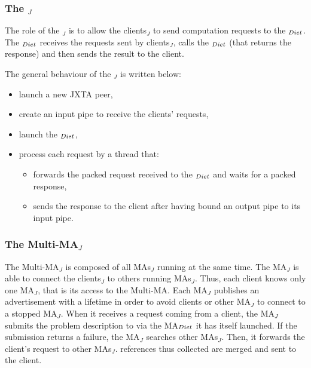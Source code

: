 \subsubsection{The \sed$_{J}$}
\label{sssec:jxtased}

The role of the \sed$_{J}$ is to allow the clients$_{J}$ to send
computation requests to the \sed$_{{\sc Diet}}$. The \sed$_{{\sc Diet}}$ receives
the requests sent by clients$_{J}$, calls the \sed$_{{\sc Diet}}$ (that
returns the response) and then sends the result to the client.

The general behaviour of the \sed$_{J}$ is written below:

\begin{itemize}
  
\item{launch a new JXTA peer,}
\item{create an input pipe to receive the clients' requests,}
\item{launch the \sed$_{{\sc Diet}}$,}
\item{process each request by a thread that:
\begin{itemize}
\item{forwards the packed request received to the \sed$_{{\sc Diet}}$ and
    waits for a packed response,}
\item{sends the response to the client after having bound an output
    pipe to its input pipe.}
\end {itemize}}
\end{itemize}

\subsubsection{The Multi-MA$_{J}$}
\label{sssec:jxtamultima}

The Multi-MA$_{J}$ is composed of all MAs$_{J}$ running at the same
time. The MA$_{J}$ is able to connect the clients$_{J}$ to others
running MAs$_{J}$. Thus, each client knows only one MA$_{J}$, that is
its access to the Multi-MA. Each MA$_{J}$ publishes an advertisement
with a lifetime in order to avoid clients or other MA$_{J}$ to connect
to a stopped MA$_{J}$. When it receives a request coming from a
client, the MA$_{J}$ submits the problem description to \diet via the
MA$_{{\sc Diet}}$ it has itself launched. If the submission returns a \diet
failure, the MA$_{J}$ searches other MAs$_{J}$. Then, it forwards the
client's request to other MAs$_{J}$. \sed references thus collected are
merged and sent to the client.

